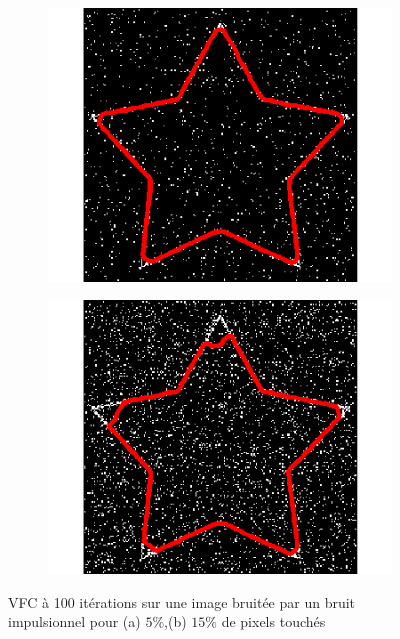 \begin{figure}[H]
\centering
\begin{subfigure}[c]{0.3\linewidth}
\centering
\includegraphics[width=\textwidth]{Chapters/Images/Noise/vfcimp5}
\caption{}
\end{subfigure}
\begin{subfigure}[c]{0.3\linewidth}
\centering
\includegraphics[width=\textwidth]{Chapters/Images/Noise/vfcimp15}
\caption{}
\end{subfigure}
\caption{VFC à 100 itérations sur une image bruitée par un bruit impulsionnel pour (a) $5\%$,(b) $15\%$ de pixels touchés}
\end{figure}

